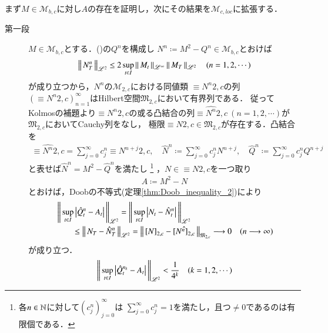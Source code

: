 	\begin{prf}
		まず$M \in \mathcal{M}_{b,c}$に対し$A$の存在を証明し，次にその結果を$\mathcal{M}_{c,loc}$に拡張する．
		\begin{description}
			\item[第一段]
				$M \in \mathcal{M}_{b,c}$とする．()の$Q^n$を構成し
				$N^n \coloneqq M^2 - Q^n \in \mathcal{M}_{b,c}$とおけば
				\begin{align}
					\left\|\, N_T^n\, \right\|_{\mathscr{L}^2} \leq 2 \operatorname*{sup}_{t \in I} \left\|\, M_t\, \right\|_{\mathscr{L}^\infty} \left\|\, M_T\, \right\|_{\mathscr{L}^2} \quad (n=1,2,\cdots)
					\label{eq:thm_existence_of_quadratic_variation_3}
				\end{align}
				が成り立つから，$N^n$の$\mathcal{M}_{2,c}$における同値類
				$\equiv{N^n}{2,c}$の列$\left( \equiv{N^n}{2,c} \right)_{n=1}^{\infty}$はHilbert空間$\mathfrak{M}_{2,c}$において有界列である．
				従ってKolmosの補題より$\equiv{N^n}{2,c}$の或る凸結合の列$\hat{\equiv{N^n}{2,c}}\ (n=1,2,\cdots)$が$\mathfrak{M}_{2,c}$においてCauchy列をなし，
				極限$\equiv{N}{2,c} \in \mathfrak{M}_{2,c}$が存在する．凸結合を
				\begin{align}
					\hat{\equiv{N^n}{2,c}} = \sum_{j=0}^{\infty} c^n_j \equiv{N^{n+j}}{2,c}, \quad
					\hat{N}^n \coloneqq \sum_{j=0}^{\infty} c^n_j N^{n+j}, \quad
					\hat{Q}^n \coloneqq \sum_{j=0}^{\infty} c^n_j Q^{n+j}
				\end{align}
				と表せば$\hat{N}^n = M^2 - \hat{Q}^n$を満たし
				\footnote{
					各$n \in \mathbb{N}$に対して$(c^n_j)_{j=0}^{\infty}$は
					$\sum_{j=0}^{\infty} c^n_j = 1$を満たし，且つ$\neq 0$であるのは有限個である．
				}
				，$N \in \equiv{N}{2,c}$を一つ取り
				\begin{align}
					A \coloneqq M^2 - N \label{eq:thm_quadratic_variation_0}
				\end{align}
				とおけば，Doobの不等式(定理\ref{thm:Doob_inequality_2})により
				\begin{align}
					&\left\|\, \operatorname*{sup}_{t \in I} \left| \hat{Q}_t^n - A_t \right|\, \right\|_{\mathscr{L}^2}
					= \left\|\, \operatorname*{sup}_{t \in I} \left| N_t - \hat{N}_t^n \right|\, \right\|_{\mathscr{L}^2} \\
					&\qquad \leq \left\|\, N_T - \hat{N}_T^n\, \right\|_{\mathscr{L}^2}
					= \left\|\, \left[N\right]_{2,c} - \hat{\left[N^n\right]_{2,c}}\, \right\|_{\mathfrak{M}_{2,c}} \longrightarrow 0 \quad (n \longrightarrow \infty) 
				\end{align}
				が成り立つ．
				\begin{align}
					\Norm{\sup{t \in I}{\left| \hat{Q}_t^{n_k} - A_t \right|}}{\mathscr{L}^2} < \frac{1}{4^k} \quad (k=1,2,\cdots)

\end{align}
\end{description}
\end{prf}
